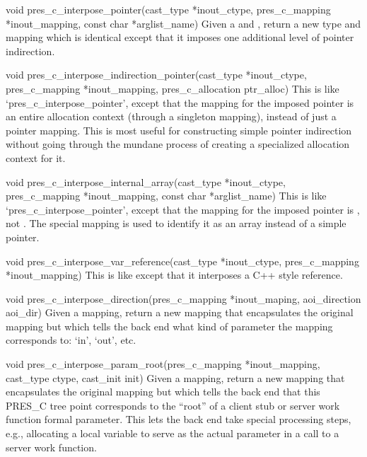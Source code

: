 \begin{cprototypelist}
  \item[void pres_c_interpose_pointer(cast_type *inout_ctype,
  pres_c_mapping *inout_mapping, const char *arglist_name)] Given a
   and , return a new type and mapping
  which is identical except that it imposes one additional level of pointer
  indirection.

  \item[void pres_c_interpose_indirection_pointer(cast_type
  *inout_ctype, pres_c_mapping *inout_mapping, pres_c_allocation ptr_alloc)]
  This is like `pres_c_interpose_pointer', except that the mapping for the
  imposed pointer is an entire allocation context (through a singleton
  mapping), instead of just a pointer mapping.  This is most useful for
  constructing simple pointer indirection without going through the mundane
  process of creating a specialized allocation context for it.

  \item[void pres_c_interpose_internal_array(cast_type
  *inout_ctype, pres_c_mapping *inout_mapping, const char *arglist_name)] This
  is like `pres_c_interpose_pointer', except that the mapping for the imposed
  pointer is , not
  .  The special
   mapping is used to identify it as an array
  instead of a simple pointer.

  \item[void pres_c_interpose_var_reference(cast_type *inout_ctype,
  pres_c_mapping *inout_mapping)] This is like
   except that it interposes a C++ style
  reference.

  \item[void pres_c_interpose_direction(pres_c_mapping
  *inout_maping, aoi_direction aoi_dir)] Given a mapping, return a new
  mapping that encapsulates the original mapping but which tells the back end
  what kind of parameter the mapping corresponds to: `in', `out', etc.

  \item[void pres_c_interpose_param_root(pres_c_mapping
  *inout_mapping, cast_type ctype, cast_init init)] Given a mapping, return a
  new mapping that encapsulates the original mapping but which tells the back
  end that this PRES_C tree point corresponds to the ``root'' of a client stub
  or server work function formal parameter.  This lets the back end take
  special processing steps, e.g., allocating a local variable to serve as the
  actual parameter in a call to a server work function.


\end{cprototypelist}
